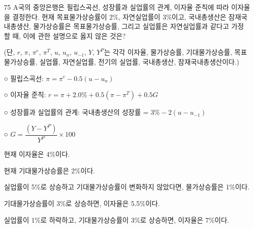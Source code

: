 \begin{question}{75}
A국의 중앙은행은 필립스곡선, 성장률과 실업률의 관계, 이자율 준칙에 따라 이자율을 결정한다. 현재 목표물가상승률이 2\%, 자연실업률이 3\%이고, 국내총생산은 잠재국내총생산, 물가상승률은 목표물가상승률, 그리고 실업률은 자연실업률과 같다고 가정할 때, 이에 관한 설명으로 옳지 않은 것은? \par
(단, $r$, $\pi$, $\pi^e$, $\pi^T$, $u$, $u_n$, $u_{-1}$, $Y$, $Y^P$는 각각 이자율, 물가상승률, 기대물가상승률, 목표물가상승률, 실업률, 자연실업률, 전기의 실업률, 국내총생산, 잠재국내총생산이다.)
\begin{framedtext}
○ 필립스곡선: $\pi = \pi^e - 0.5(u - u_n)$ \par
○ 이자율 준칙: $r = \pi + 2.0\% + 0.5(\pi - \pi^T) + 0.5G$ \par
○ 성장률과 실업률의 관계: 국내총생산의 성장률 = $3\% - 2(u - u_{-1})$ \par
○ $G = \dfrac{(Y - Y^P)}{Y^P} \times 100$ \par
\end{framedtext}
\begin{choices}
  \item 현재 이자율은 4\%이다.
  \item 현재 기대물가상승률은 2\%이다.
  \item 실업률이 5\%로 상승하고 기대물가상승률이 변화하지 않았다면, 물가상승률은 1\%이다.
  \item 기대물가상승률이 3\%로 상승하면, 이자율은 5.5\%이다.
  \item 실업률이 1\%로 하락하고, 기대물가상승률이 3\%로 상승하면, 이자율은 7\%이다.
\end{choices}
\end{question}
